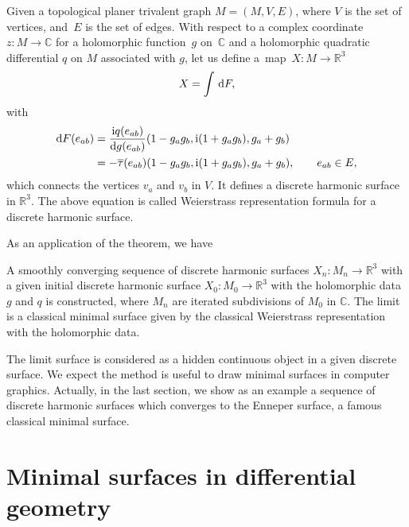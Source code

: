 \documentclass[10pt,a4paper]{amsart}
\newcommand{\R}{\mathbb{R}}
\newcommand{\C}{\mathbb{C}}
\newcommand{\ii}{{\mathrm{i}}}
\let\Re\relax
\DeclareMathOperator{\Re}{Re}
\let\Re\relax
\DeclareMathOperator{\Re}{{\mathrm Re}}
\newcommand{\1}{{\bf 1}}
\numberwithin{equation}{section}
\begin{document}
\begin{theorem*}
 Given a topological planer trivalent graph $M=(M,V,E)$, where $V$ is the set of vertices, and~$E$ is the set of edges.
 With respect to a complex coordinate $z\colon M \to \C$ for a holomorphic function~$g$ on~$\C$
 and a holomorphic quadratic differential $q$ on $M$ associated with $g$,
 let us define a~map~${X\colon M \to \R^3}$
 \begin{displaymath}
 X = \int \Re\, {\rm d}F,
 \end{displaymath}
 with
 \begin{align}
 {\rm d}F(e_{ab}) &= \frac{\ii q(e_{ab})}{{\rm d}g(e_{ab})}(1-g_ag_b, \ii(1+g_ag_b), g_a+g_b)\nonumber\\
 &=-\overline{\tau}(e_{ab}) (1-g_ag_b, \ii(1+g_ag_b), g_a+g_b), \qquad e_{ab} \in E,\label{eq:weierstrass}
 \end{align}
which connects the vertices $v_a$ and $v_b$ in $V$. It defines a discrete harmonic surface in $\R^3$.
 The above equation is called Weierstrass representation formula for a discrete harmonic surface.
\end{theorem*}

As an application of the theorem, we have
\begin{theorem*}
 A smoothly converging sequence of discrete harmonic surfaces $X_n \colon M_n \to \R^3$
 with a given initial discrete harmonic surface $X_0\colon M_0 \to \R^3$ with the holomorphic data $g$ and $q$ is constructed,
 where $M_n$ are iterated subdivisions of $M_0$ in $\C$.
 The limit is a classical minimal surface given by the classical Weierstrass representation with the holomorphic data.
\end{theorem*}
The limit surface is considered as a hidden continuous object in a given discrete surface.
We expect the method is useful to draw minimal surfaces in computer graphics.
Actually, in the last section, we show as an example a sequence of discrete harmonic surfaces which converges to the Enneper surface, a famous classical minimal surface.

\section{Minimal surfaces in differential geometry}
\end{document}
